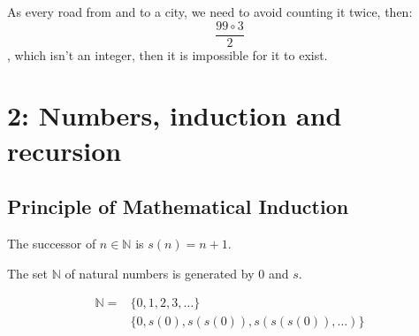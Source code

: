 \documentclass[12pt, a4paper]{book}
\begin{document}
As every road from and to a city, we need to avoid counting it twice, then:
$$\displaystyle\frac{99 \circ 3}{2}$$, 
which isn't an integer, then it is impossible for it to exist. 







\chapter{2: Numbers, induction and recursion}

\section{Principle of Mathematical Induction}
The successor of $n\in\mathbb{N}$ is $s(n)=n+1$.

The set $\mathbb{N}$ of natural numbers is generated by $0$ and $s$.

\[
    \begin{aligned}
        \mathbb{N} = &\{0,1,2,3,\ldots\} \\
        &\{0,s(0),s(s(0)),s(s(s(0)),\ldots)\}
    \end{aligned}
\]
\end{document}
